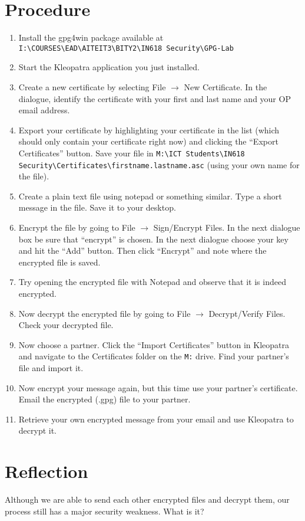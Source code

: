 \documentclass{article}
\begin{document}
\section{Procedure}
\begin{enumerate}
\item Install the gpg4win package available at \texttt{I:\textbackslash{}COURSES\textbackslash{}EAD\textbackslash{}AITEIT3\textbackslash{}BITY2\textbackslash{}IN618 Security\textbackslash{}GPG-Lab}

\item Start the Kleopatra application you just installed.

\item Create a new certificate by selecting File $\rightarrow$ New Certificate. In the dialogue, identify the certificate with your first and last name and your OP email address.

\item Export your certificate by highlighting your certificate in the list (which should only contain your certificate right now) and clicking the ``Export Certificates'' button. Save your file in \texttt{M:\textbackslash{}ICT Students\textbackslash{}IN618 Security\textbackslash{}Certificates\textbackslash{}firstname.lastname.asc} (using your own name for the file).

\item Create a plain text file using notepad or something similar. Type a short message in the file. Save it to your desktop.

\item Encrypt the file by going to File $\rightarrow$ Sign/Encrypt Files. In the next dialogue box be sure that ``encrypt'' is chosen. In the next dialogue choose your key and hit the ``Add'' button. Then click ``Encrypt'' and note where the encrypted file is saved.

\item Try opening the encrypted file with Notepad and observe that it is indeed encrypted.

\item Now decrypt the encrypted file by going to File $\rightarrow$ Decrypt/Verify Files. Check your decrypted file.

\item Now choose a partner. Click the ``Import Certificates'' button in Kleopatra and navigate to the Certificates folder on the \texttt{M:} drive. Find your partner’s file and import it.

\item Now encrypt your message again, but this time use your partner's certificate. Email the encrypted (.gpg) file to your partner.

\item Retrieve your own encrypted message from your email and use Kleopatra to decrypt it.
\end{enumerate}

\section{Reflection}
Although we are able to send each other encrypted files and decrypt them, our process still has a major security weakness. What is it?
\end{document}
